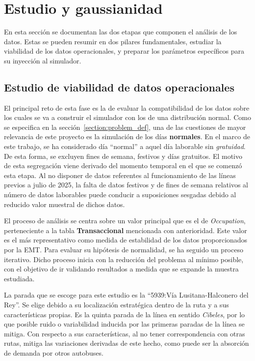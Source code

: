 \section{Estudio y gaussianidad}\label{section:gauss_and_study}
En esta sección se documentan las dos etapas que componen el análisis de los datos. Estas se pueden resumir en
dos pilares fundamentales, estudiar la viabilidad de los datos operacionales, y preparar
los parámetros específicos para su inyección al simulador.

\subsection{Estudio de viabilidad de datos operacionales}\label{section:operational}
El principal reto de esta fase es la de evaluar la compatibilidad de los datos sobre los cuales se va a construir
el simulador con los de una distribución normal. Como se especifica en la sección~\ref{section:problem_def}, una de 
las cuestiones de mayor relevancia
de este proyecto es la simulación de los días \textbf{normales}. En el marco de este trabajo, se ha considerado
día \enquote{normal} a aquel día laborable sin \textit{gratuidad}. De esta forma, se excluyen fines de semana,
festivos y días gratuitos. El motivo de esta segregación viene derivado del momento temporal en el que se comenzó
esta etapa. Al no disponer de datos referentes al funcionamiento de las líneas previos a julio de 2025, la falta 
de datos festivos y de fines de semana relativos al número de datos laborables 
puede conducir a suposiciones sesgadas debido al reducido valor muestral de dichos datos.

El proceso de análisis se centra sobre un valor principal que es el de \textit{Occupation}, perteneciente
a la tabla \textbf{Transaccional} mencionada con anterioridad. Este valor es el
más representativo como medida de estabilidad de los datos proporcionados por la EMT.\@
Para evaluar su hipótesis de normalidad, se ha seguido 
un proceso iterativo. Dicho proceso inicia con la reducción del problema al mínimo posible, con el 
objetivo de ir validando resultados a medida que se expande la muestra estudiada.

La parada que se escoge para este estudio es la \enquote{5939:Vía Lusitana-Halconero del Rey}. Se elige
debido a su localización estratégica dentro de la ruta y a sus características propias. Es la quinta parada 
de la línea en sentido \textit{Cibeles}, por lo que posible ruido o variabilidad inducida por las 
primeras paradas de la línea se mitiga. Con respecto a sus características, al no tener correspondencia con 
otras rutas, mitiga las variaciones derivadas de este hecho, como puede ser la absorción de demanda
por otros autobuses.

